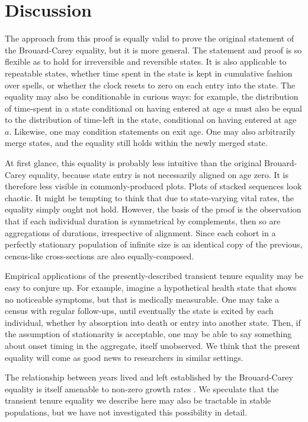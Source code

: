 \documentclass[12pt,oneside,a4paper]{article} %
\theoremstyle{definition}
\begin{document}
\section{Discussion}
The approach from this proof is equally valid to prove the
original statement of the Brouard-Carey equality, but it is more general. The
statement and proof is so flexible as to hold for irreversible and reversible
states. It is also applicable to repeatable states, whether time spent in the
state is kept in cumulative fashion over spells, or whether the clock resets to
zero on each entry into the state. The equality may also be conditionable in
curious ways: for example, the distribution of time-spent in a state conditional
on having entered at age $a$ must also be equal to the distribution of time-left in
the state, conditional on having entered at age $a$. Likewise, one may condition
statements on exit age. One may also arbitrarily merge states, and the equality
still holds within the newly merged state.

At first glance, this equality is probably less intuitive than the
original Brouard-Carey equality, because state entry is not necessarily aligned
on age zero. It is therefore less visible in commonly-produced plots. Plots of
stacked sequences look chaotic. It might be tempting to think that due to
state-varying vital rates, the equality simply ought not hold.
However, the basis of the proof is the observation that if each individual
duration is symmetrical by complements, then so are aggregations of
durations, irrespective of alignment. Since each cohort in a perfectly
stationary population of infinite size is an identical copy of the previous,
census-like cross-sections are also equally-composed.

Empirical applications of the presently-described transient tenure equality may
be easy to conjure up. For example, imagine a hypothetical health state that
shows no noticeable symptoms, but that is medically measurable. One
may take a census with regular follow-ups, until eventually the state is exited
by each individual, whether by absorption into death or entry into another
state. Then, if the assumption of stationarity is acceptable, one may be able to
say something about onset timing in the aggregate, itself unobserved. We think
that the present equality will come as good news to researchers in similar
settings.

The relationship between years lived and left established by the Brouard-Carey
equality is itself amenable to non-zero growth rates \citep{riffe2015renewal}.
We speculate that the transient tenure equality we describe here may also be tractable in stable
populations, but we have not investigated this possibility in detail.
\end{document}
